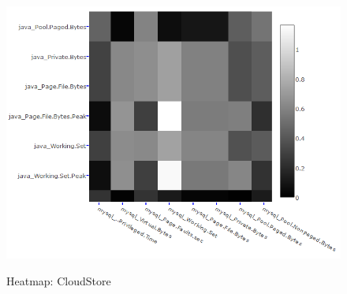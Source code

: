 \begin{figure}[tbh]
	\centering
	{\includegraphics[width=\columnwidth]{figures/cloudstore_heatmap_smaller_new.png}}
	\caption{Heatmap: CloudStore}
	\label{fig:Results Table}
\end{figure}


%			


